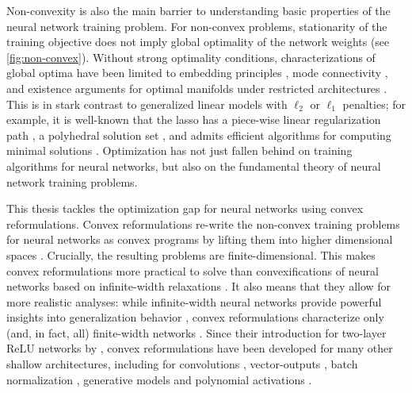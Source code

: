 Non-convexity is also the main barrier to understanding basic properties of the
neural network training problem.
For non-convex problems, stationarity of the training objective does not imply
global optimality of the network weights (see \cref{fig:non-convex}).
Without strong optimality conditions, characterizations of global optima have
been limited to embedding principles
\citep{fukumizu2000plateau, zhang2021embedding}, mode connectivity
\citep{garipov2018mode, draxler2018barriers}, and existence
arguments for optimal manifolds under restricted architectures
\citep{cooper2021global}.
This is in stark contrast to generalized linear models with \( \ell_2 \)
or \( \ell_1 \) penalties;
for example, it is well-known that the lasso \citep{tibshirani1996regression}
has a piece-wise linear regularization path \citep{osborne2000new, efron2004least},
a polyhedral solution set \citep{tibshirani2013unique}, and
admits efficient algorithms for computing
minimal solutions \citep{tibshirani2013unique}.
Optimization has not just fallen behind on training algorithms for neural
networks, but also on the fundamental theory of neural network training
problems.

This thesis tackles the optimization gap for neural networks using convex
reformulations.
Convex reformulations re-write the non-convex training problems for neural
networks as convex programs by lifting them into higher dimensional spaces
\citep{pilanci2020convexnn}.
Crucially, the resulting problems are finite-dimensional.
This makes convex reformulations more practical to solve than convexifications
of neural networks based on infinite-width relaxations
\citep{bengio2006convex}.
It also means that they allow for more realistic analyses:
while infinite-width neural networks provide powerful insights into
generalization behavior \citep{bach2017breaking}, convex reformulations
characterize only (and, in fact, all) finite-width networks
\citep{wang2022hidden}.
Since their introduction for two-layer ReLU networks by
\citet{pilanci2020convexnn}, convex reformulations have been developed for many
other shallow architectures, including for convolutions
\citep{sahiner2020convex,ergen2021implicit,gupta2021exact}, vector-outputs
\citep{sahiner2021vector}, batch normalization \citep{ergen2021demystifying},
generative models \citep{sahiner2021hidden} and polynomial activations
\citep{bartan2025polynomial}.

